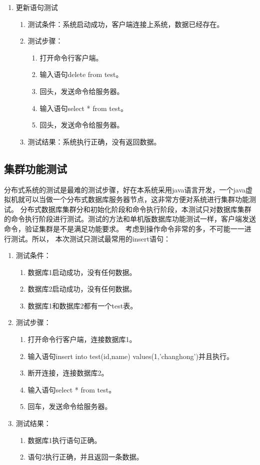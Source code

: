 \begin{enumerate}
\item 更新语句测试
\begin{enumerate}
	\item 测试条件：系统启动成功，客户端连接上系统，数据已经存在。
	\item 测试步骤：
	\begin{enumerate}
		\item 打开命令行客户端。
		\item 输入语句delete from test。
		\item 回头，发送命令给服务器。
		\item 输入语句select * from test。
		\item 回头，发送命令给服务器。
	\end{enumerate}
	\item 	测试结果：系统执行正确，没有返回数据。
\end{enumerate}	
\end{enumerate}	
\subsection{集群功能测试}
分布式系统的测试是最难的测试步骤，好在本系统采用java语言开发，一个java虚拟机就可以当做一个分布式数据库服务器节点，这非常方便对系统进行集群功能测试。
分布式数据库集群分和初始化阶段和命令执行阶段，本测试只对数据库集群的命令执行阶段进行测试。测试的方法和单机版数据库功能测试一样，客户端发送命令，验证集群是不是满足功能要求。
考虑到操作命令非常的多，不可能一一进行测试。所以，
本次测试只测试最常用的insert语句：
\begin{enumerate}
	\item 测试条件：
	\begin{enumerate}
		\item 数据库1启动成功，没有任何数据。
		\item 数据库2启动成功，没有任何数据。
		\item 数据库1和数据库2都有一个test表。
	\end{enumerate}
	\item 测试步骤：
	\begin{enumerate}
		\item 打开命令行客户端，连接数据库1。
		\item 输入语句insert into test(id,name) values(1,'changhong')并且执行。
		\item 断开连接，连接数据库2。
		\item 输入语句select * from test。
		\item 回车，发送命令给服务器。
	\end{enumerate}
	\item 	测试结果：
	\begin{enumerate}
		\item 数据库1执行语句正确。
		\item 语句2执行正确，并且返回一条数据。
	\end{enumerate}
\end{enumerate}	
